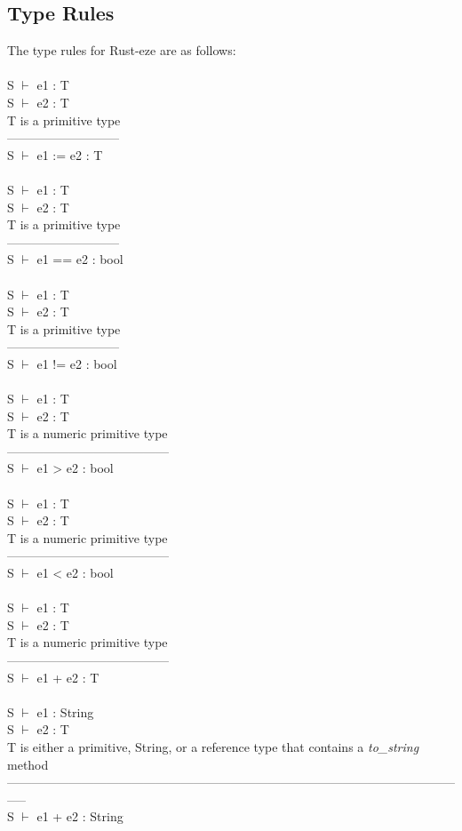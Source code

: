\documentclass[letterpaper, 10pt, DIV=13]{scrartcl}
\numberwithin{equation}{section}
\numberwithin{figure}{section}
\numberwithin{table}{section}
\begin{document}
\subsection{Type Rules}
The type rules for Rust-eze are as follows: \\ \\
S $\vdash$ e1 : T \\
S $\vdash$ e2 : T \\
T is a primitive type \\
--------------------------- \\
S $\vdash$ e1 := e2 : T \\
\\
S $\vdash$ e1 : T \\
S $\vdash$ e2 : T \\
T is a primitive type \\
--------------------------- \\
S $\vdash$ e1 == e2 : bool \\
\\
S $\vdash$ e1 : T \\
S $\vdash$ e2 : T \\
T is a primitive type \\
--------------------------- \\
S $\vdash$ e1 != e2 : bool \\
\\
S $\vdash$ e1 : T \\
S $\vdash$ e2 : T \\
T is a numeric primitive type \\
--------------------------------------- \\
S $\vdash$ e1 > e2 : bool \\
\\
S $\vdash$ e1 : T \\
S $\vdash$ e2 : T \\
T is a numeric primitive type \\
--------------------------------------- \\
S $\vdash$ e1 < e2 : bool \\
\\
S $\vdash$ e1 : T \\
S $\vdash$ e2 : T \\
T is a numeric primitive type \\
--------------------------------------- \\
S $\vdash$ e1 + e2 : T \\
\\
S $\vdash$ e1 : String \\
S $\vdash$ e2 : T \\
T is either a primitive, String, or a reference type that contains a \textit{to\_string} method \\
----------------------------------------------------------------------------------------------------------------- \\
S $\vdash$ e1 + e2 : String
\end{document}
